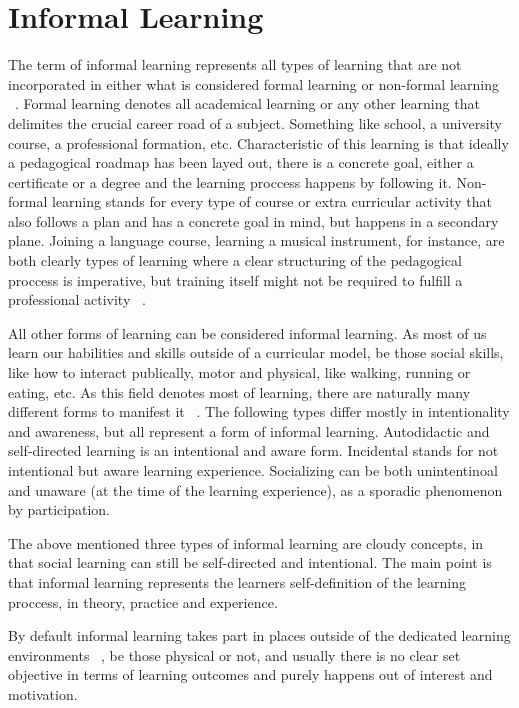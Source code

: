 \section{Informal Learning}
\label{section:informal_learning}


The term of informal learning represents all types of learning that are not 
incorporated in either what is considered formal learning or non-formal learning
~\cite{dewey_1938}.
Formal learning denotes all academical learning or any other learning that delimites 
the crucial career road of a subject. Something like school, a university course, 
a professional formation, etc. Characteristic of this learning is that ideally 
a pedagogical roadmap has been layed out, there is a concrete goal, either a 
certificate or a degree and the learning proccess happens by following it.
Non-formal learning stands for every type of course or extra curricular activity that
also follows a plan and has a concrete goal in mind, but happens in a secondary plane.
Joining a language course, learning a musical instrument, for instance, are both
clearly types of learning where a clear structuring of the pedagogical proccess is
imperative, but training itself might not be required to fulfill a professional 
activity ~\cite{adultsinformallearning}.

All other forms of learning can be considered informal learning. As most of us learn
our habilities and skills outside of a curricular model, be those social skills, 
like how to interact publically, motor and physical, like walking, running or eating,
etc. As this field denotes most of learning, there are naturally many different 
forms to manifest it ~\cite{theformsofinformallearning}. The following types 
differ mostly in intentionality and awareness, but all represent a form of informal
learning. Autodidactic and self-directed learning is an intentional and aware form. 
Incidental stands for not intentional but aware learning experience. Socializing 
can be both unintentinoal and unaware (at the time of the learning experience), as 
a sporadic phenomenon by participation.

The above mentioned three types of informal learning are cloudy concepts, in that
social learning can still be self-directed and intentional. The main point 
is that informal learning represents the learners self-definition of the learning
proccess, in theory, practice and experience.

By default informal learning takes part in places outside of the dedicated learning
environments ~\cite{bridginginschoolandoutofschoollearning}, be those physical 
or not, and usually there is no clear set objective in terms of learning outcomes 
and purely happens out of interest and motivation.

